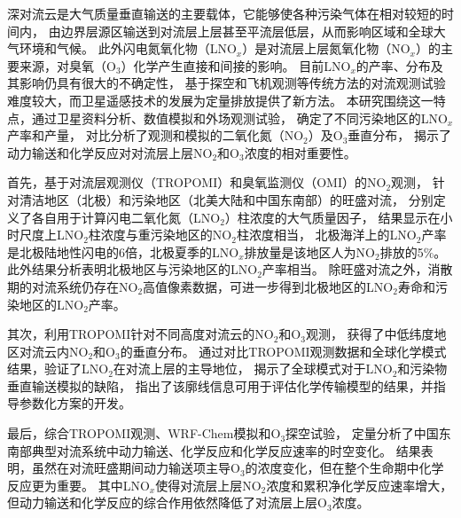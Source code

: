 
\abstract
{
深对流云是大气质量垂直输送的主要载体，它能够使各种污染气体在相对较短的时间内，
由边界层源区输送到对流层上层甚至平流层低层，从而影响区域和全球大气环境和气候。
此外闪电氮氧化物（LNO$_x$）是对流层上层氮氧化物（NO$_x$）的主要来源，对臭氧（O$_3$）化学产生直接和间接的影响。
目前LNO$_x$的产率、分布及其影响仍具有很大的不确定性，
基于探空和飞机观测等传统方法的对流观测试验难度较大，而卫星遥感技术的发展为定量排放提供了新方法。
本研究围绕这一特点，通过卫星资料分析、数值模拟和外场观测试验，
确定了不同污染地区的LNO$_x$产率和产量，
对比分析了观测和模拟的二氧化氮（NO$_2$）及O$_3$垂直分布，
揭示了动力输送和化学反应对对流层上层NO$_2$和O$_3$浓度的相对重要性。

首先，基于对流层观测仪（TROPOMI）和臭氧监测仪（OMI）的NO$_2$观测，
针对清洁地区（北极）和污染地区（北美大陆和中国东南部）的旺盛对流，
分别定义了各自用于计算闪电二氧化氮（LNO$_2$）柱浓度的大气质量因子，
结果显示在小时尺度上LNO$_2$柱浓度与重污染地区的NO$_2$柱浓度相当，
北极海洋上的LNO$_2$产率是北极陆地性闪电的6倍，北极夏季的LNO$_x$排放量是该地区人为NO$_2$排放的5\%。
此外结果分析表明北极地区与污染地区的LNO$_2$产率相当。
除旺盛对流之外，消散期的对流系统仍存在NO$_2$高值像素数据，可进一步得到北极地区的LNO$_2$寿命和污染地区的LNO$_2$产率。

其次，利用TROPOMI针对不同高度对流云的NO$_2$和O$_3$观测，
获得了中低纬度地区对流云内NO$_2$和O$_3$的垂直分布。
通过对比TROPOMI观测数据和全球化学模式结果，验证了LNO$_2$在对流上层的主导地位，
揭示了全球模式对于LNO$_2$和污染物垂直输送模拟的缺陷，
指出了该廓线信息可用于评估化学传输模型的结果，并指导参数化方案的开发。

最后，综合TROPOMI观测、WRF-Chem模拟和O$_3$探空试验，
定量分析了中国东南部典型对流系统中动力输送、化学反应和化学反应速率的时空变化。
结果表明，虽然在对流旺盛期间动力输送项主导O$_3$的浓度变化，但在整个生命期中化学反应更为重要。
其中LNO$_x$使得对流层上层NO$_2$浓度和累积净化学反应速率增大，但动力输送和化学反应的综合作用依然降低了对流层上层O$_3$浓度。
}
